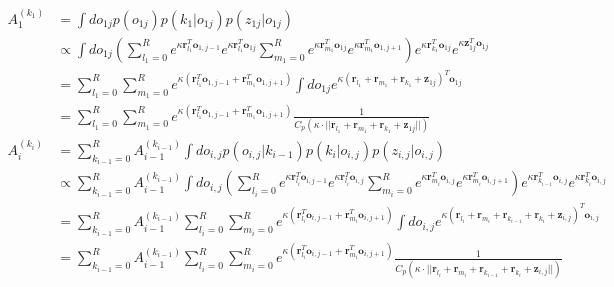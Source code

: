 \documentclass[11pt]{article}
\begin{document}
\begin{align*}
A_1^{(k_1)} &= \int do_{1j} p(o_{1j}) p(k_1|o_{1j}) p(z_{1j}|o_{1j}) \\
&\propto \int do_{1j} \left( \sum_{l_1=0}^R e^{\kappa \mathbf{r}_{l_1}^T \mathbf{o}_{1,j-1}}e^{\kappa \mathbf{r}_{l_1}^T \mathbf{o}_{1j}} \sum_{m_1=0}^R e^{\kappa \mathbf{r}_{m_1}^T \mathbf{o}_{1j}} e^{\kappa \mathbf{r}_{m_1}^T \mathbf{o}_{1,j+1}} \right) e^{\kappa \mathbf{r}_{k_1}^T \mathbf{o}_{1j}} e^{\kappa \mathbf{z}_{1j}^T\mathbf{o}_{1j}} \\
&= \sum_{l_1=0}^R \sum_{m_1=0}^R e^{\kappa (\mathbf{r}_{l_1}^T\mathbf{o}_{1,j-1}+\mathbf{r}_{m_1}^T\mathbf{o}_{1,j+1})} \int do_{1j} e^{\kappa(\mathbf{r}_{l_1}+\mathbf{r}_{m_1}+\mathbf{r}_{k_1}+\mathbf{z}_{1j})^T\mathbf{o}_{1j}} \\
&= \sum_{l_1=0}^R \sum_{m_1=0}^R e^{\kappa (\mathbf{r}_{l_1}^T\mathbf{o}_{1,j-1}+\mathbf{r}_{m_1}^T\mathbf{o}_{1,j+1})} \frac{1}{C_p(\kappa\cdot ||\mathbf{r}_{l_1}+\mathbf{r}_{m_1}+\mathbf{r}_{k_1}+\mathbf{z}_{1j}||)} \\
A_i^{(k_i)} &= \sum_{k_{i-1}=0}^R A_{i-1}^{(k_{i-1})} \int do_{i,j} p(o_{i,j}|k_{i-1})p(k_i|o_{i,j})p(z_{i,j}|o_{i,j}) \\
&\propto \sum_{k_{i-1}=0}^R A_{i-1}^{(k_{i-1})} \int do_{i,j} \left( \sum_{l_i=0}^R e^{\kappa\mathbf{r}_{l_i}^T\mathbf{o}_{i,j-1}} e^{\kappa\mathbf{r}_{l_i}^T\mathbf{o}_{i,j}} \sum_{m_i=0}^R e^{\kappa\mathbf{r}_{m_i}^T\mathbf{o}_{i,j}} e^{\kappa\mathbf{r}_{m_i}^T\mathbf{o}_{i,j+1}}\right) e^{\kappa \mathbf{r}_{k_{i-1}}^T \mathbf{o}_{i,j}} e^{\kappa \mathbf{r}_{k_i}^T \mathbf{o}_{i,j}} \\
&= \sum_{k_{i-1}=0}^R A_{i-1}^{(k_{i-1})} \sum_{l_i=0}^R \sum_{m_i=0}^R e^{\kappa\left(\mathbf{r}_{l_i}^T\mathbf{o}_{i,j-1}+\mathbf{r}_{m_i}^T\mathbf{o}_{i,j+1}\right)} \int do_{i,j} e^{\kappa(\mathbf{r}_{l_i}+\mathbf{r}_{m_i}+\mathbf{r}_{k_{i-1}}+\mathbf{r}_{k_i}+\mathbf{z}_{i,j})^T\mathbf{o}_{i,j}} \\
&= \sum_{k_{i-1}=0}^R A_{i-1}^{(k_{i-1})} \sum_{l_i=0}^R \sum_{m_i=0}^R e^{\kappa\left(\mathbf{r}_{l_i}^T\mathbf{o}_{i,j-1}+\mathbf{r}_{m_i}^T\mathbf{o}_{i,j+1}\right)} \frac{1}{C_p(\kappa\cdot ||\mathbf{r}_{l_i}+\mathbf{r}_{m_i}+\mathbf{r}_{k_{i-1}}+\mathbf{r}_{k_i}+\mathbf{z}_{i,j}||)} 
\end{align*}
\end{document}
